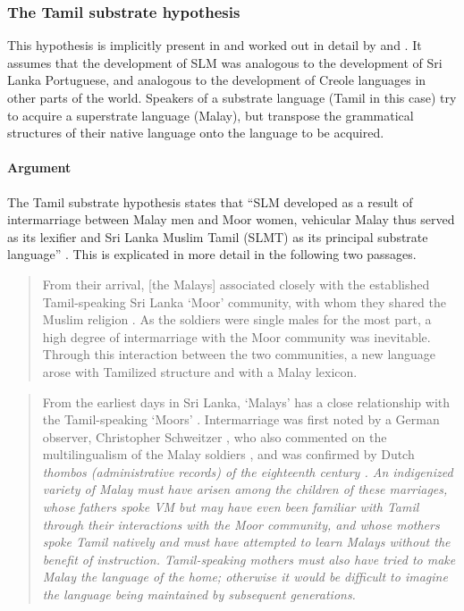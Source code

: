 \subsubsection{The Tamil substrate hypothesis}
This hypothesis is implicitly present in \citet{Hussainmiya1990} and worked out in detail by \citet{SmithEtAl2004, Paauw2004} and  \citet{SmithEtAl2006cll}. It assumes that the development of SLM was analogous to the development of Sri Lanka Portuguese, and analogous to the development of Creole languages in other parts of the world. Speakers of a substrate language (Tamil in this case) try to acquire a superstrate language (Malay), but transpose the grammatical structures of their native language onto the language to be acquired.
 

\paragraph{Argument}
The Tamil substrate hypothesis states that ``SLM developed as a result of intermarriage between Malay men and Moor women,   vehicular Malay  thus served as its lexifier and Sri Lanka Muslim Tamil (SLMT) as its principal  substrate language'' \citep{SmithEtAl2004}.
This is explicated in more detail in the following two passages.

\begin{quote}
From their arrival, [the Malays] associated closely with the established Tamil-speaking Sri Lanka `Moor' community, with whom they  shared the Muslim religion \el. As the soldiers were single males for the most part, a high degree of intermarriage with the Moor community was inevitable. Through this interaction between the two communities, a new language arose with Tamilized structure and with a Malay lexicon. \citep[160]{SmithEtAl2006cll}
\end{quote}


\begin{quote}
From the earliest days in Sri Lanka, `Malays' has a close relationship with the Tamil-speaking `Moors' \el. Intermarriage was first noted by a German observer, Christopher Schweitzer \el, who also commented on the multilingualism of the Malay soldiers \citep[49--50]{Hussainmiya1987}, and was confirmed by Dutch \em thombos \em (administrative records) of the eighteenth century  \citep[52]{Hussainmiya1987}. An indigenized variety of Malay must have arisen among the children of these marriages, whose fathers spoke VM but may have even been familiar with Tamil through their interactions with the Moor community, and whose mothers spoke Tamil natively and must have attempted to learn Malays without the benefit of instruction. Tamil-speaking mothers must also have tried to make Malay the language of the home; otherwise it would be difficult to imagine the language being maintained by subsequent generations.
 \citep[176f]{SmithEtAl2006cll}
\end{quote}


